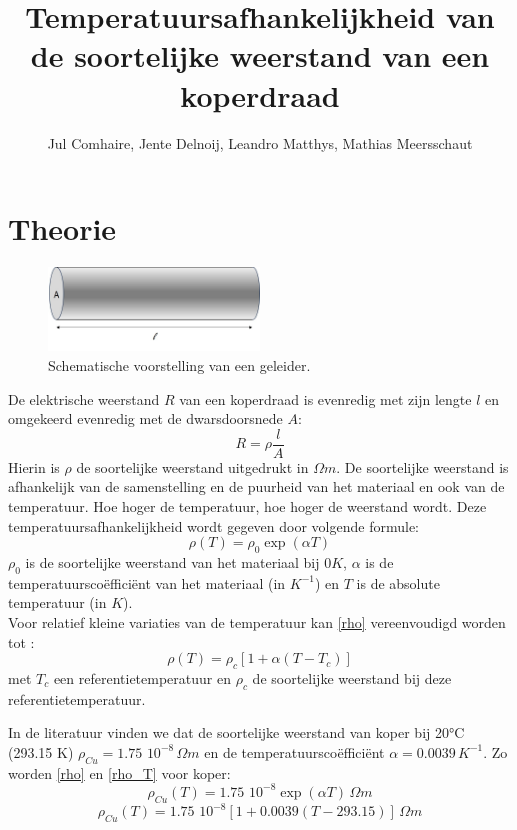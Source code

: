 \documentclass[12pt]{article}
\title{Temperatuursafhankelijkheid van de soortelijke weerstand van een koperdraad}
\author{Jul Comhaire, Jente Delnoij, Leandro Matthys, Mathias Meersschaut}
\begin{document}
	\maketitle

\section{Theorie}

	\begin{figure}[h]
		\centering
		\includegraphics[width=0.5\textwidth]{fig_draad2}
		\caption{Schematische voorstelling van een geleider.}  \label{fig:geleider}
	\end{figure}

	De elektrische weerstand $R$ van een koperdraad  is evenredig met zijn lengte $l$ en omgekeerd evenredig met de dwarsdoorsnede $A$:
		\begin{equation}\label{R}
			R = \rho \frac{l}{A}
		\end{equation}
	Hierin is $\rho$ de soortelijke weerstand uitgedrukt in $\Omega m$. De soortelijke weerstand is afhankelijk van de samenstelling en de puurheid van het materiaal en ook van de temperatuur. Hoe hoger de temperatuur, hoe hoger de weerstand wordt.
	Deze temperatuursafhankelijkheid wordt gegeven \cite{B} door volgende formule:
		\begin{equation}\label{rho}
			\rho(T) = \rho_0 \exp{(\alpha T)}
		\end{equation}
	$\rho_0$ is de soortelijke weerstand van het materiaal bij $0 K$, $\alpha$ is de temperatuurscoëfficiënt van het materiaal (in $K^{-1}$) en $T$ is de absolute temperatuur (in $K$).
	\\
	Voor relatief kleine variaties van de temperatuur \cite{A} kan \eqref{rho} vereenvoudigd worden tot :
		\begin{equation}\label{rho_T}
			\rho(T) = \rho_c [1+\alpha (T-T_c)]
		\end{equation}
	met $T_c$ een referentietemperatuur en $\rho_c$ de soortelijke weerstand bij deze referentietemperatuur. 
	
	In de literatuur \cite{B,C} vinden we dat de soortelijke weerstand van koper bij 20°C (293.15 K) $\rho_{Cu} = 1.75 \, \, 10^{-8} \, \Omega m$ en de temperatuurscoëfficiënt $\alpha = 0.0039 \, K^{-1}$.
	Zo worden \eqref{rho} en \eqref{rho_T} voor koper:
		\begin{equation}\label{rho_cu_exp}
			\rho_{Cu} (T) = 1.75 \, \, 10^{-8}  \exp{(\alpha T)} \, \Omega m  
		\end{equation}
		\begin{equation}\label{rho_cu_approx}
			\rho_{Cu}(T) = 1.75 \, \, 10^{-8} [1+0.0039 (T-293.15)] \, \Omega m     
		\end{equation}
	
\end{document}
